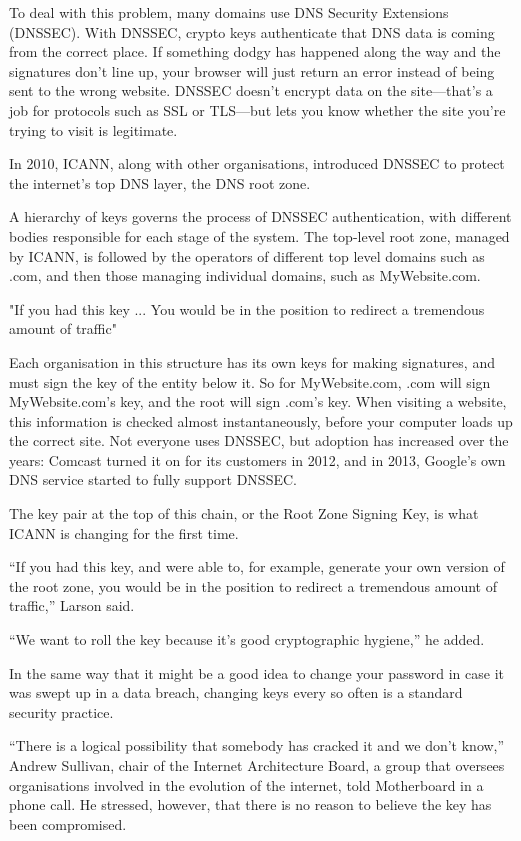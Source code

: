 \documentclass{article}
\begin{document}
To deal with this problem, many domains use DNS Security Extensions (DNSSEC).
With DNSSEC, crypto keys authenticate that DNS data is coming from the correct
place. If something dodgy has happened along the way and the signatures don't
line up, your browser will just return an error instead of being sent to the
wrong website. DNSSEC doesn't encrypt data on the site—that's a job for
protocols such as SSL or TLS—but lets you know whether the site you're trying
to visit is legitimate.

In 2010, ICANN, along with other organisations, introduced DNSSEC to protect
the internet’s top DNS layer, the DNS root zone.

A hierarchy of keys governs the process of DNSSEC authentication, with
different bodies responsible for each stage of the system. The top-level root
zone, managed by ICANN, is followed by the operators of different top level
domains such as .com, and then those managing individual domains, such as
MyWebsite.com.

"If you had this key ... You would be in the position to redirect a tremendous
amount of traffic"

Each organisation in this structure has its own keys for making signatures, and
must sign the key of the entity below it. So for MyWebsite.com, .com will sign
MyWebsite.com's key, and the root will sign .com's key. When visiting a
website, this information is checked almost instantaneously, before your
computer loads up the correct site. Not everyone uses DNSSEC, but adoption has
increased over the years: Comcast turned it on for its customers in 2012, and
in 2013, Google’s own DNS service started to fully support DNSSEC.

The key pair at the top of this chain, or the Root Zone Signing Key, is what
ICANN is changing for the first time.

“If you had this key, and were able to, for example, generate your own version
of the root zone, you would be in the position to redirect a tremendous amount
of traffic,” Larson said.

“We want to roll the key because it's good cryptographic hygiene,” he added.

In the same way that it might be a good idea to change your password in case it
was swept up in a data breach, changing keys every so often is a standard
security practice.

“There is a logical possibility that somebody has cracked it and we don’t
know,” Andrew Sullivan, chair of the Internet Architecture Board, a group that
oversees organisations involved in the evolution of the internet, told
Motherboard in a phone call. He stressed, however, that there is no reason to
believe the key has been compromised.
\end{document}
